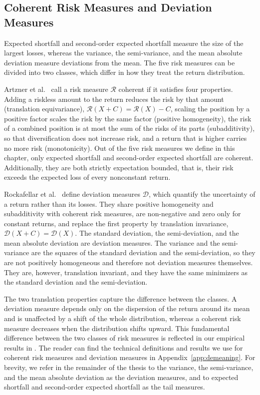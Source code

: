 \subsection{Coherent Risk Measures and Deviation Measures}\label{sec:coherent-and-deviation-measures}
Expected shortfall and second-order expected shortfall measure the size of the largest losses, whereas the variance,
the semi-variance, and the mean absolute deviation measure deviations from the mean.
The five risk measures can be divided into two classes, which differ in how they treat the return
distribution.

Artzner et al.~\cite{CoherentMeasuresOfRisk} call a risk measure $\mathcal{R}$ coherent if it satisfies four
properties. Adding a riskless amount to the return reduces the risk by that amount (translation equivariance),
$\mathcal{R}(X + C) = \mathcal{R}(X) - C$, scaling the position by a positive factor scales the risk by the same
factor (positive homogeneity), the risk of a combined position is at most the sum of the risks of its parts (subadditivity),
so that diversification does not
increase risk, and a return that is higher carries no more risk (monotonicity). Out of the five risk measures we define in this chapter, only expected shortfall \cite{acerbi2002coherenceexpectedshortfall} and
second-order expected shortfall \cite{Krokhmal2007} are coherent. Additionally, they are both strictly expectation bounded, that
is, their risk exceeds the expected loss of every nonconstant return.

Rockafellar et al.~\cite{RockafellarUryasevZabarankin2006} define deviation measures $\mathcal{D}$, which quantify
the uncertainty of a return rather than its losses. They share positive homogeneity and subadditivity with coherent risk
measures, are non-negative and zero only for constant returns, and replace the first property by translation
invariance, $\mathcal{D}(X + C) = \mathcal{D}(X)$. The standard deviation, the semi-deviation, and the mean absolute deviation are deviation measures.
The variance and the semi-variance are the
squares of the standard deviation and the semi-deviation, so they are not positively homogeneous and therefore not
deviation measures themselves. They are, however, translation invariant, and they have the same minimizers as 
the standard deviation and the semi-deviation.

The two translation properties capture the difference between the classes. A deviation measure depends only on the
dispersion of the return around its mean and is unaffected by a shift of the whole distribution, whereas a coherent
risk measure decreases when the distribution shifts upward. This fundamental difference between the two classes of risk measures is reflected 
in our empirical results in . The reader can find the technical definitions and results we use for coherent risk measures 
and deviation measures in Appendix~\ref{app:demeaning}. For brevity, we refer in the remainder of the thesis to
the variance, the semi-variance, and the mean absolute deviation as the deviation measures, and to expected shortfall
and second-order expected shortfall as the tail measures.
 

